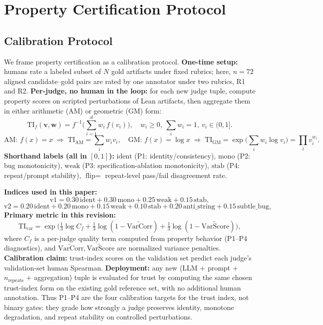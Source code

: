\documentclass{article}
\begin{document}
\section{Property Certification Protocol}
\subsection{Calibration Protocol}
We frame property certification as a calibration protocol.
\textbf{One-time setup:} humans rate a labeled subset of \(N\) gold artifacts under fixed rubrics; here, \(n=72\) aligned candidate--gold pairs are rated by one annotator under two rubrics, R1 and R2.
\textbf{Per-judge, no human in the loop:} for each new judge tuple, compute property scores on scripted perturbations of Lean artifacts, then aggregate them in either arithmetic (AM) or geometric (GM) form:
\[
  \mathrm{TI}_{f}(\mathbf{v},\mathbf{w})
  =
  f^{-1}\!\Big(\sum_{i=1}^{d} w_i\, f(v_i)\Big),
  \quad
  w_i\ge 0,\ \sum_i w_i=1,\ v_i\in(0,1].
\]
\[
  \text{AM: } f(x)=x
  \;\Rightarrow\;
  \mathrm{TI}_{\mathrm{AM}}=\sum_i w_i v_i,
  \quad
  \text{GM: } f(x)=\log x
  \;\Rightarrow\;
  \mathrm{TI}_{\mathrm{GM}}=\exp\!\Big(\sum_i w_i\log v_i\Big)=\prod_i v_i^{w_i}.
\]
\textbf{Shorthand labels (all in \([0,1]\)):}
\(\text{ident}\) (P1: identity/consistency),
\(\text{mono}\) (P2: bug monotonicity),
\(\text{weak}\) (P3: specification-ablation monotonicity),
\(\text{stab}\) (P4: repeat/prompt stability),
\(\text{flip}=\) repeat-level pass/fail disagreement rate.

\textbf{Indices used in this paper:}
\[
  \text{v1} = 0.30\,\text{ident} + 0.30\,\text{mono} + 0.25\,\text{weak} + 0.15\,\text{stab},
\]
\[
  \text{v2} = 0.20\,\text{ident} + 0.20\,\text{mono} + 0.15\,\text{weak} + 0.10\,\text{stab} + 0.20\,\text{anti\_string} + 0.15\,\text{subtle\_bug},
\]
\textbf{Primary metric in this revision:}
\[
  \mathrm{TI}_{\mathrm{var}}
  =
  \exp\!\Big(\tfrac{1}{3}\log C_f
  +\tfrac{1}{3}\log(1-\widetilde{\mathrm{VarCorr}})
  +\tfrac{1}{3}\log(1-\widetilde{\mathrm{VarScore}})\Big),
\]
where \(C_f\) is a per-judge quality term computed from property behavior (P1--P4 diagnostics), and \(\widetilde{\mathrm{VarCorr}},\widetilde{\mathrm{VarScore}}\) are normalized variance penalties.
\textbf{Calibration claim:} trust-index scores on the validation set predict each judge's validation-set human Spearman.
\textbf{Deployment:} any new (LLM + prompt + \(n_\text{repeats}\) + aggregation) tuple is evaluated for trust by computing the same chosen trust-index form on the existing gold reference set, with no additional human annotation.
Thus P1--P4 are the four calibration targets for the trust index, not binary gates: they grade how strongly a judge preserves identity, monotone degradation, and repeat stability on controlled perturbations.
\end{document}
